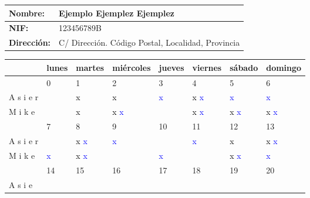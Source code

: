 \documentclass{article}%
\begin{document}
%
\normalsize%
\vspace*{10ex}%
\begin{tabular}{l|l}%
\textbf{Nombre:}&Ejemplo Ejemplez Ejemplez\\%
\hline%
\textbf{NIF:}&123456789B\\%
\hline%
\textbf{Dirección:}&C/ Dirección. Código Postal, Localidad, Provincia\\%
\hline%
\end{tabular}%
\vspace*{10ex}%
\renewcommand{\arraystretch}{1.5}%
\begin{longtabu}{| X[l] | X[c] | X[c] | X[c] | X[c] | X[c] | X[c] | X[c] |}%
\hline%
%
\textbf{}&\textbf{lunes}&\textbf{martes}&\textbf{miércoles}&\textbf{jueves}&\textbf{viernes}&\textbf{sábado}&\textbf{domingo}\\%
\hline%
&0&1&2&3&4&5&6\\%
\hline%
A%
s%
i%
e%
r&&\textcolor{black}{%
x%
}%
\textcolor{blue}{%
}&\textcolor{black}{%
x%
}%
\textcolor{blue}{%
}&\textcolor{black}{%
}%
\textcolor{blue}{%
x%
}&\textcolor{black}{%
x%
}%
\textcolor{blue}{%
x%
}&\textcolor{black}{%
}%
\textcolor{blue}{%
x%
}&\textcolor{black}{%
}%
\textcolor{blue}{%
x%
}\\%
M%
i%
k%
e&&\textcolor{black}{%
x%
}%
\textcolor{blue}{%
}&\textcolor{black}{%
x%
}%
\textcolor{blue}{%
x%
}&\textcolor{black}{%
}%
\textcolor{blue}{%
}&\textcolor{black}{%
x%
}%
\textcolor{blue}{%
x%
}&\textcolor{black}{%
x%
}%
\textcolor{blue}{%
x%
}&\textcolor{black}{%
x%
}%
\textcolor{blue}{%
x%
}\\%
\hline%
\hline%
&7&8&9&10&11&12&13\\%
\hline%
A%
s%
i%
e%
r&\textcolor{black}{%
}%
\textcolor{blue}{%
}&\textcolor{black}{%
x%
}%
\textcolor{blue}{%
x%
}&\textcolor{black}{%
}%
\textcolor{blue}{%
x%
}&\textcolor{black}{%
}%
\textcolor{blue}{%
}&\textcolor{black}{%
}%
\textcolor{blue}{%
x%
}&\textcolor{black}{%
x%
}%
\textcolor{blue}{%
}&\textcolor{black}{%
x%
}%
\textcolor{blue}{%
x%
}\\%
M%
i%
k%
e&\textcolor{black}{%
}%
\textcolor{blue}{%
x%
}&\textcolor{black}{%
x%
}%
\textcolor{blue}{%
x%
}&\textcolor{black}{%
}%
\textcolor{blue}{%
}&\textcolor{black}{%
}%
\textcolor{blue}{%
x%
}&\textcolor{black}{%
}%
\textcolor{blue}{%
}&\textcolor{black}{%
x%
}%
\textcolor{blue}{%
x%
}&\textcolor{black}{%
}%
\textcolor{blue}{%
x%
}\\%
\hline%
\hline%
&14&15&16&17&18&19&20\\%
\hline%
A%
s%
i%
e%

\end{longtabu}
\end{document}
